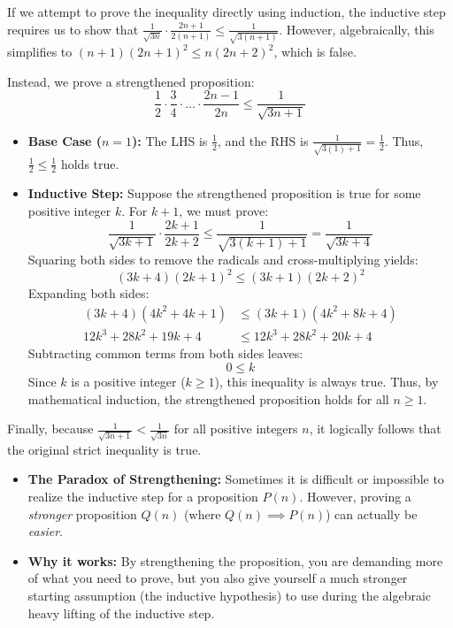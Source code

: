 \begin{solution}
If we attempt to prove the inequality directly using induction, the inductive step requires us to show that $\frac{1}{\sqrt{3n}} \cdot \frac{2n+1}{2(n+1)} \leqslant \frac{1}{\sqrt{3(n+1)}}$. However, algebraically, this simplifies to $(n+1)(2n+1)^2 \leqslant n(2n+2)^2$, which is false.

Instead, we prove a strengthened proposition:
\[
\frac{1}{2} \cdot \frac{3}{4} \cdot \dots \cdot \frac{2n-1}{2n} \leqslant \frac{1}{\sqrt{3n+1}}
\]

\begin{itemize}[leftmargin=*]
    \item \textbf{Base Case ($n=1$):} The LHS is $\frac{1}{2}$, and the RHS is $\frac{1}{\sqrt{3(1)+1}} = \frac{1}{2}$. Thus, $\frac{1}{2} \leqslant \frac{1}{2}$ holds true.
    \item \textbf{Inductive Step:} Suppose the strengthened proposition is true for some positive integer $k$. For $k+1$, we must prove:
    \[
    \frac{1}{\sqrt{3k+1}} \cdot \frac{2k+1}{2k+2} \leqslant \frac{1}{\sqrt{3(k+1)+1}} = \frac{1}{\sqrt{3k+4}}
    \]
    Squaring both sides to remove the radicals and cross-multiplying yields:
    \[
    (3k+4)(2k+1)^2 \leqslant (3k+1)(2k+2)^2
    \]
    Expanding both sides:
    \begin{align*}
    (3k+4)(4k^2+4k+1) &\leqslant (3k+1)(4k^2+8k+4) \\
    12k^3 + 28k^2 + 19k + 4 &\leqslant 12k^3 + 28k^2 + 20k + 4
    \end{align*}
    Subtracting common terms from both sides leaves:
    \[
    0 \leqslant k
    \]
    Since $k$ is a positive integer ($k \geqslant 1$), this inequality is always true. Thus, by mathematical induction, the strengthened proposition holds for all $n \geqslant 1$.
\end{itemize}

Finally, because $\frac{1}{\sqrt{3n+1}} < \frac{1}{\sqrt{3n}}$ for all positive integers $n$, it logically follows that the original strict inequality is true.
\end{solution}

\begin{takeaways}
\begin{itemize}[leftmargin=*]
    \item \textbf{The Paradox of Strengthening:} Sometimes it is difficult or impossible to realize the inductive step for a proposition $P(n)$. However, proving a \textit{stronger} proposition $Q(n)$ (where $Q(n) \implies P(n)$) can actually be \textit{easier}.
    \item \textbf{Why it works:} By strengthening the proposition, you are demanding more of what you need to prove, but you also give yourself a much stronger starting assumption (the inductive hypothesis) to use during the algebraic heavy lifting of the inductive step.
\end{itemize}
\end{takeaways}


